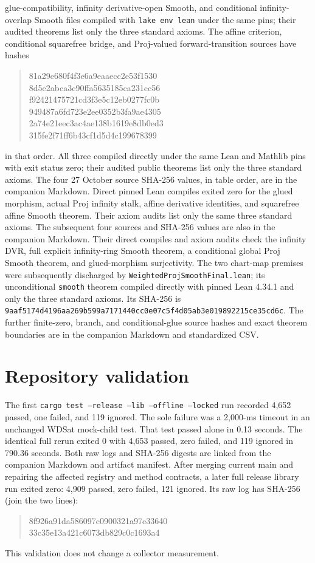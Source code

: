 \documentclass[10pt]{article}
\begin{document}
glue-compatibility, infinity derivative-open Smooth, and conditional
infinity-overlap Smooth files compiled with \texttt{lake env lean} under
the same pins; their audited theorems list only the three standard axioms.
The affine criterion, conditional squarefree bridge, and Proj-valued
forward-transition sources have hashes
\begin{quote}\scriptsize\ttfamily
81a29e680f4f3e6a9eaaecc2e53f1530\\
8d5e2abca3c90ffa5635185ca231cc56\\
f92421475721cd3f3e5c12eb0277fc0b\\
949487a6fd723e2ee0352b3fa9ae4305\\
2a74e21eec3ac4ae138b1619e8db0ed3\\
315fe2f71ff6b43cf1d5d4c199678399
\end{quote}
in that order. All three compiled directly under the same Lean and Mathlib
pins with exit status zero; their audited public theorems list only the
three standard axioms.
The four 27 October source SHA-256 values, in table order, are in the
companion Markdown. Direct pinned Lean compiles exited zero for the glued
morphism, actual Proj infinity stalk, affine derivative identities, and
squarefree affine Smooth theorem. Their axiom audits list only the same
three standard axioms.
The subsequent four sources and SHA-256 values are also in the companion
Markdown. Their direct compiles and axiom audits check the infinity DVR,
full explicit infinity-ring Smooth theorem, a conditional global Proj Smooth
theorem, and glued-morphism surjectivity. The two chart-map premises were
subsequently discharged by \texttt{WeightedProjSmoothFinal.lean}; its
unconditional \texttt{smooth} theorem compiled directly with pinned Lean
4.34.1 and only the three standard axioms. Its SHA-256 is
\texttt{9aaf5174d4196aa269b599a7171440cc0e07c5f4d05ab3e019892215ce35cd6c}.
The further finite-zero, branch, and conditional-glue source hashes and
exact theorem boundaries are in the companion Markdown and standardized CSV.
\section*{Repository validation}
The first \texttt{cargo test --release --lib --offline --locked} run recorded
4,652 passed, one failed, and 119 ignored. The sole failure was a 2,000-ms
timeout in an unchanged WDSat mock-child test. That test passed alone in
0.13 seconds. The identical full rerun exited 0 with 4,653 passed,
zero failed, and 119 ignored in 790.36 seconds. Both raw logs and SHA-256
digests are linked from the companion Markdown and artifact manifest.
After merging current main and repairing the affected registry and method
contracts, a later full release library run exited zero: 4,909 passed,
zero failed, 121 ignored. Its raw log has SHA-256 (join the two lines):
\begin{quote}\scriptsize\ttfamily
8f926a91da586097c0900321a97e33640\\
33c35e13a421c6073db829c0c1693a4
\end{quote}
This validation does not change a collector measurement.
\end{document}
